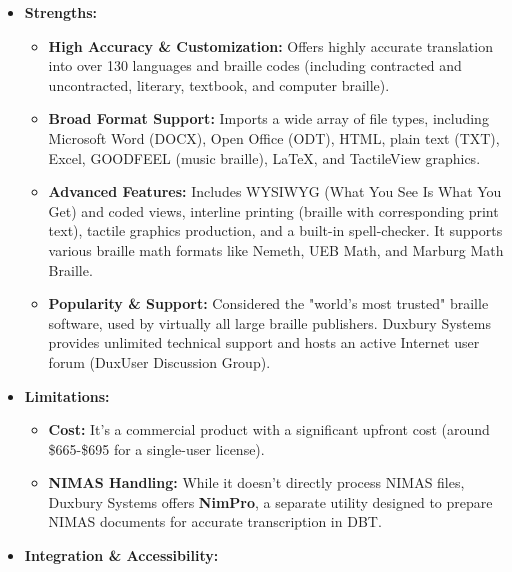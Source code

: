 \begin{itemize}
    \item \textbf{Strengths:}
    \begin{itemize}
        \item \textbf{High Accuracy \& Customization:} Offers highly accurate translation into over 130 languages and braille codes (including contracted and uncontracted, literary, textbook, and computer braille)\footnotemark{}.
        \item \textbf{Broad Format Support:} Imports a wide array of file types, including Microsoft Word (DOCX), Open Office (ODT), HTML, plain text (TXT), Excel, GOODFEEL (music braille), LaTeX, and TactileView graphics\footnotemark{}.
        \item \textbf{Advanced Features:} Includes WYSIWYG (What You See Is What You Get) and coded views, interline printing (braille with corresponding print text), tactile graphics production, and a built-in spell-checker. It supports various braille math formats like Nemeth, UEB Math, and Marburg Math Braille.
        \item \textbf{Popularity \& Support:} Considered the "world's most trusted" braille software, used by virtually all large braille publishers\footnotemark{}. Duxbury Systems provides unlimited technical support and hosts an active Internet user forum (DuxUser Discussion Group).
    \end{itemize}
    \item \textbf{Limitations:}
    \begin{itemize}
        \item \textbf{Cost:} It's a commercial product with a significant upfront cost (around \$665-\$695 for a single-user license)\footnotemark{}.
        \item \textbf{NIMAS Handling:} While it doesn't directly process NIMAS files, Duxbury Systems offers \textbf{NimPro}, a separate utility designed to prepare NIMAS documents for accurate transcription in DBT\footnotemark{}.
    \end{itemize}
    \item \textbf{Integration & Accessibility:}
    \begin{itemize}

\end{itemize}
\end{itemize}
